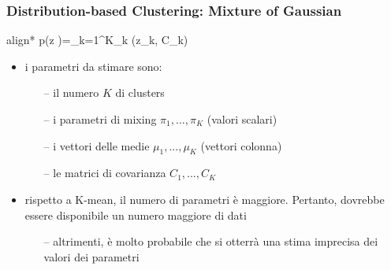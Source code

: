\begin{frame}

	\frametitle{{\color{GradientDescentDiagramOrange}Distribution-based Clustering}: Mixture of Gaussian}

		\begin{empheq}[box=\fcolorbox{blue!40!black!60}{yellow!10}]{align*}
			p(z \vert \Theta )=\sum_{k=1}^{K}\pi_k (z\vert\mu_k, C_k)
		\end{empheq}

		\begin{itemize}
			\item i parametri da stimare sono:
				\begin{itemize}
					\item[--] il numero $K$ di clusters
					\item[--] i parametri di mixing $\pi_1,...,\pi_K$ (valori scalari)
					\item[--] i vettori delle medie $\mu_1,...,\mu_K$ (vettori colonna)
					\item[--] le matrici di covarianza $C_1,...,C_K$
				\end{itemize}
			\item rispetto a K-mean, il numero di parametri è maggiore. Pertanto, dovrebbe essere disponibile un numero maggiore di dati
				\begin{itemize}
					\item[--] altrimenti, è molto probabile che si otterrà una stima imprecisa dei valori dei parametri
				\end{itemize}

		\end{itemize}

\end{frame}


